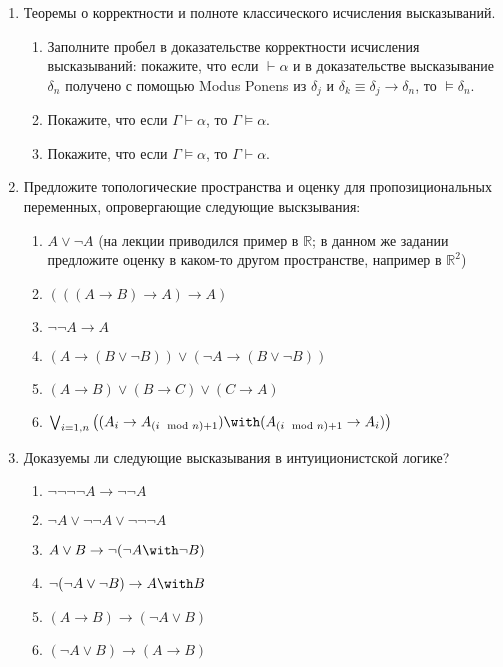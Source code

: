 \documentclass[10pt,a4paper,oneside]{article}
\begin{document}
\begin{enumerate}

\item Теоремы о корректности и полноте классического исчисления высказываний.
\begin{enumerate}
\item Заполните пробел в доказательстве корректности исчисления высказываний: 
покажите, что если $\vdash \alpha$ и в доказательстве высказывание
$\delta_n$ получено с помощью Modus Ponens из $\delta_j$ и $\delta_k \equiv \delta_j\rightarrow\delta_n$,
то $\models \delta_n$.

\item Покажите, что если $\Gamma \vdash \alpha$, то $\Gamma \models \alpha$.
\item Покажите, что если $\Gamma \models \alpha$, то $\Gamma \vdash \alpha$.
\end{enumerate}

\item Предложите топологические пространства и оценку для пропозициональных переменных,
опровергающие следующие выскзывания:

\begin{enumerate}
\item $A \vee \neg A$ (на лекции приводился пример в $\mathbb{R}$; в данном же задании предложите оценку в 
каком-то другом пространстве, например в $\mathbb{R}^2$)
\item $(((A \rightarrow B) \rightarrow A) \rightarrow A)$
\item $\neg\neg A \rightarrow A$
\item $(A \rightarrow (B \vee \neg B)) \vee (\neg A \rightarrow (B \vee \neg B))$
\item $(A \rightarrow B) \vee (B \rightarrow C) \vee (C \rightarrow A)$
\item $\bigvee_{i=1,n} \left((A_i \rightarrow A_{(i\mod n) + 1}) \with (A_{(i\mod n)+1} \rightarrow A_i)\right)$
\end{enumerate}

\item Доказуемы ли следующие высказывания в интуиционистской логике?
\begin{enumerate}
\item $\neg\neg\neg\neg A \rightarrow \neg\neg A$
\item $\neg A \vee \neg\neg A \vee \neg\neg\neg A$
\item $A \vee B \rightarrow \neg (\neg A \with \neg B)$
\item $\neg (\neg A \vee \neg B) \rightarrow A \with B$
\item $(A \rightarrow B) \rightarrow (\neg A \vee B)$
\item $(\neg A \vee B) \rightarrow (A \rightarrow B)$
\end{enumerate}


\end{enumerate}
\end{document}
